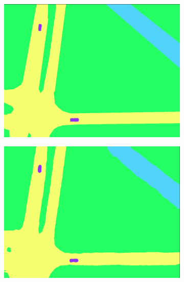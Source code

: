 \begin{figure}[h!]
     \centering
     \begin{subfigure}[b]{0.45\textwidth}
         \centering
         \includegraphics[width=\textwidth]{img/1_1.png}
         \caption{}
         \label{}
     \end{subfigure}
     \hfill
     \begin{subfigure}[b]{0.45\textwidth}
         \centering
         \includegraphics[width=\textwidth]{img/1_2.png}
         \caption{}
         \label{}
     \end{subfigure}
     \hfill
     \begin{subfigure}[b]{0.45\textwidth}
         \centering

\end{subfigure}
\end{figure}
